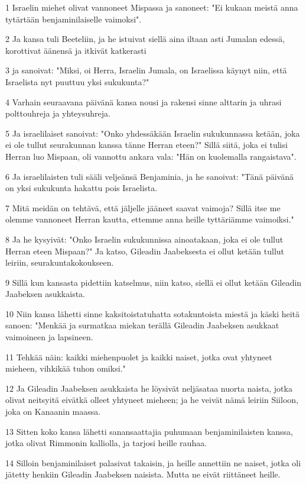 \par 1 Israelin miehet olivat vannoneet Mispassa ja sanoneet: "Ei kukaan meistä anna tytärtään benjaminilaiselle vaimoksi".
\par 2 Ja kansa tuli Beeteliin, ja he istuivat siellä aina iltaan asti Jumalan edessä, korottivat äänensä ja itkivät katkerasti
\par 3 ja sanoivat: "Miksi, oi Herra, Israelin Jumala, on Israelissa käynyt niin, että Israelista nyt puuttuu yksi sukukunta?"
\par 4 Varhain seuraavana päivänä kansa nousi ja rakensi sinne alttarin ja uhrasi polttouhreja ja yhteysuhreja.
\par 5 Ja israelilaiset sanoivat: "Onko yhdessäkään Israelin sukukunnassa ketään, joka ei ole tullut seurakunnan kanssa tänne Herran eteen?" Sillä siitä, joka ei tulisi Herran luo Mispaan, oli vannottu ankara vala: "Hän on kuolemalla rangaistava".
\par 6 Ja israelilaisten tuli sääli veljeänsä Benjaminia, ja he sanoivat: "Tänä päivänä on yksi sukukunta hakattu pois Israelista.
\par 7 Mitä meidän on tehtävä, että jäljelle jääneet saavat vaimoja? Sillä itse me olemme vannoneet Herran kautta, ettemme anna heille tyttäriämme vaimoiksi."
\par 8 Ja he kysyivät: "Onko Israelin sukukunnissa ainoatakaan, joka ei ole tullut Herran eteen Mispaan?" Ja katso, Gileadin Jaabeksesta ei ollut ketään tullut leiriin, seurakuntakokoukseen.
\par 9 Sillä kun kansasta pidettiin katselmus, niin katso, siellä ei ollut ketään Gileadin Jaabeksen asukkaista.
\par 10 Niin kansa lähetti sinne kaksitoistatuhatta sotakuntoista miestä ja käski heitä sanoen: "Menkää ja surmatkaa miekan terällä Gileadin Jaabeksen asukkaat vaimoineen ja lapsineen.
\par 11 Tehkää näin: kaikki miehenpuolet ja kaikki naiset, jotka ovat yhtyneet mieheen, vihkikää tuhon omiksi."
\par 12 Ja Gileadin Jaabeksen asukkaista he löysivät neljäsataa nuorta naista, jotka olivat neitsyitä eivätkä olleet yhtyneet mieheen; ja he veivät nämä leiriin Siiloon, joka on Kanaanin maassa.
\par 13 Sitten koko kansa lähetti sanansaattajia puhumaan benjaminilaisten kanssa, jotka olivat Rimmonin kalliolla, ja tarjosi heille rauhaa.
\par 14 Silloin benjaminilaiset palasivat takaisin, ja heille annettiin ne naiset, jotka oli jätetty henkiin Gileadin Jaabeksen naisista. Mutta ne eivät riittäneet heille.

